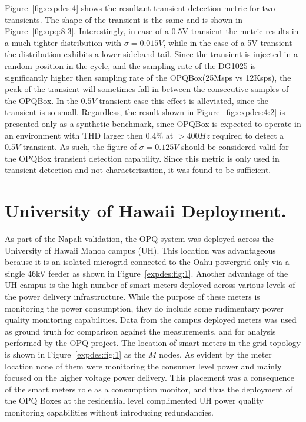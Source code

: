Figure~\ref{fig:expdes:4} shows the resultant transient detection metric for two transients.
The shape of the transient is the same and is shown in Figure~\ref{fig:opq:8:3}.
Interestingly, in case of a 0.5V transient the metric results in a much tighter distribution with $\sigma =0.015V$, while in the case of
a 5V transient the distribution exhibits a lower sideband tail.
Since the transient is injected in a random position in the cycle, and the sampling rate of the DG1025 is significantly higher then sampling rate of the OPQBox(25Msps vs 12Ksps), the peak of the transient will sometimes fall in between the consecutive samples of the OPQBox.
In the $0.5V$ transient case this effect is alleviated, since the transient is so small.
Regardless, the result shown in Figure~\ref{fig:expdes:4:2} is presented only as a synthetic benchmark, since OPQBox is expected to operate in an environment with THD larger then $0.4\%$ at $>400Hz$ required to detect a $0.5V$ transient.
As such, the figure of $\sigma=0.125V$ should be considered valid for the OPQBox transient detection capability.
Since this metric is only used in transient detection and not characterization, it was found to be sufficient.
\clearpage
\section{University of Hawaii Deployment.}\label{sec:university-of-hawaii-deployment.2}

As part of the Napali validation, the OPQ system was deployed across the University of Hawaii Manoa campus (UH).
This location was advantageous because it is an isolated microgrid connected to the Oahu powergrid only via a single 46kV feeder as shown in Figure~\ref{expdes:fig:1}.
Another advantage of the UH campus is the high number of smart meters deployed across various levels of the power delivery infrastructure.
While the purpose of these meters is monitoring the power consumption, they do include some rudimentary power quality monitoring capabilities.
Data from the campus deployed meters was used as ground truth for comparison against the measurements, and for analysis performed by the OPQ project.
The location of smart meters in the grid topology is shown in Figure~\ref{expdes:fig:1} as the $M$ nodes.
As evident by the meter location none of them were monitoring the consumer level power and mainly focused on the higher voltage power delivery.
This placement was a consequence of the smart meters role as a consumption monitor, and thus the deployment of the OPQ Boxes at the residential level complimented UH power quality monitoring capabilities without introducing redundancies.

